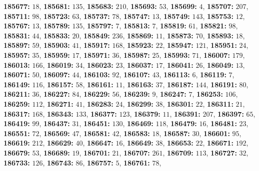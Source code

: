 \textsf{\bfseries 185677:} $18$, \textsf{\bfseries 185681:} $135$, \textsf{\bfseries 185683:} $210$, \textsf{\bfseries 185693:} $53$, \textsf{\bfseries 185699:} $4$, \textsf{\bfseries 185707:} $207$, \textsf{\bfseries 185711:} $98$, \textsf{\bfseries 185723:} $63$, \textsf{\bfseries 185737:} $78$, \textsf{\bfseries 185747:} $13$, \textsf{\bfseries 185749:} $143$, \textsf{\bfseries 185753:} $12$, \textsf{\bfseries 185767:} $13$, \textsf{\bfseries 185789:} $135$, \textsf{\bfseries 185797:} $7$, \textsf{\bfseries 185813:} $7$, \textsf{\bfseries 185819:} $61$, \textsf{\bfseries 185821:} $98$, \textsf{\bfseries 185831:} $44$, \textsf{\bfseries 185833:} $20$, \textsf{\bfseries 185849:} $236$, \textsf{\bfseries 185869:} $11$, \textsf{\bfseries 185873:} $70$, \textsf{\bfseries 185893:} $18$, \textsf{\bfseries 185897:} $59$, \textsf{\bfseries 185903:} $41$, \textsf{\bfseries 185917:} $168$, \textsf{\bfseries 185923:} $22$, \textsf{\bfseries 185947:} $121$, \textsf{\bfseries 185951:} $24$, \textsf{\bfseries 185957:} $35$, \textsf{\bfseries 185959:} $17$, \textsf{\bfseries 185971:} $36$, \textsf{\bfseries 185987:} $25$, \textsf{\bfseries 185993:} $71$, \textsf{\bfseries 186007:} $179$, \textsf{\bfseries 186013:} $166$, \textsf{\bfseries 186019:} $34$, \textsf{\bfseries 186023:} $23$, \textsf{\bfseries 186037:} $17$, \textsf{\bfseries 186041:} $26$, \textsf{\bfseries 186049:} $13$, \textsf{\bfseries 186071:} $50$, \textsf{\bfseries 186097:} $44$, \textsf{\bfseries 186103:} $92$, \textsf{\bfseries 186107:} $43$, \textsf{\bfseries 186113:} $6$, \textsf{\bfseries 186119:} $7$, \textsf{\bfseries 186149:} $116$, \textsf{\bfseries 186157:} $58$, \textsf{\bfseries 186161:} $11$, \textsf{\bfseries 186163:} $37$, \textsf{\bfseries 186187:} $144$, \textsf{\bfseries 186191:} $80$, \textsf{\bfseries 186211:} $36$, \textsf{\bfseries 186227:} $84$, \textsf{\bfseries 186229:} $56$, \textsf{\bfseries 186239:} $9$, \textsf{\bfseries 186247:} $7$, \textsf{\bfseries 186253:} $106$, \textsf{\bfseries 186259:} $112$, \textsf{\bfseries 186271:} $41$, \textsf{\bfseries 186283:} $24$, \textsf{\bfseries 186299:} $38$, \textsf{\bfseries 186301:} $22$, \textsf{\bfseries 186311:} $21$, \textsf{\bfseries 186317:} $168$, \textsf{\bfseries 186343:} $133$, \textsf{\bfseries 186377:} $123$, \textsf{\bfseries 186379:} $11$, \textsf{\bfseries 186391:} $207$, \textsf{\bfseries 186397:} $65$, \textsf{\bfseries 186419:} $99$, \textsf{\bfseries 186437:} $31$, \textsf{\bfseries 186451:} $130$, \textsf{\bfseries 186469:} $118$, \textsf{\bfseries 186479:} $16$, \textsf{\bfseries 186481:} $23$, \textsf{\bfseries 186551:} $72$, \textsf{\bfseries 186569:} $47$, \textsf{\bfseries 186581:} $42$, \textsf{\bfseries 186583:} $18$, \textsf{\bfseries 186587:} $30$, \textsf{\bfseries 186601:} $95$, \textsf{\bfseries 186619:} $212$, \textsf{\bfseries 186629:} $40$, \textsf{\bfseries 186647:} $16$, \textsf{\bfseries 186649:} $38$, \textsf{\bfseries 186653:} $22$, \textsf{\bfseries 186671:} $192$, \textsf{\bfseries 186679:} $53$, \textsf{\bfseries 186689:} $19$, \textsf{\bfseries 186701:} $21$, \textsf{\bfseries 186707:} $261$, \textsf{\bfseries 186709:} $113$, \textsf{\bfseries 186727:} $32$, \textsf{\bfseries 186733:} $126$, \textsf{\bfseries 186743:} $86$, \textsf{\bfseries 186757:} $5$, \textsf{\bfseries 186761:} $78$, 

